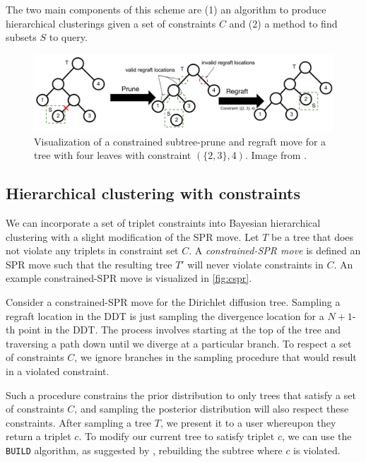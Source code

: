 \documentclass{article}
\begin{document}
The two main components of this scheme are (1) an algorithm
to produce hierarchical clusterings given a set of constraints $C$
and (2) a method to find subsets $S$ to query.

\begin{figure}[t]
  \includegraphics[width=\textwidth]{img/cspr}
  \caption{Visualization of a constrained subtree-prune and regraft move for a
  tree with four leaves with constraint $(\{2, 3\}, 4)$. Image from \citep{Vikram2016}.}
\label{fig:cspr}
\end{figure}

\subsection{Hierarchical clustering with constraints}

We can incorporate a set of triplet constraints into Bayesian
hierarchical clustering with a slight modification
of the SPR move.
Let $T$ be a tree that does not violate
any triplets in constraint set $C$.
A \emph{constrained-SPR move} is defined
an SPR move such that the resulting tree $T'$
will never violate constraints in $C$.
An example constrained-SPR move is visualized in \autoref{fig:cspr}.

Consider a constrained-SPR move for the Dirichlet diffusion tree.
Sampling a regraft location in the DDT is just
sampling the divergence location for a $N + 1$-th point
in the DDT\@. The process involves starting at the top
of the tree and traversing a path down until we diverge
at a particular branch.
To respect a set of constraints $C$, we ignore
branches in the sampling procedure that would result in a violated constraint.

Such a procedure constrains the prior distribution
to only trees that satisfy a set of constraints $C$,
and sampling the posterior distribution will also respect these
constraints.
After sampling a tree $T$, we present it to a user
whereupon they return a triplet $c$.
To modify our current tree to satisfy triplet $c$, we can
use the {\tt BUILD} algorithm, as suggested by \citep{Aho1981},
rebuilding the subtree where $c$ is violated.
\end{document}
